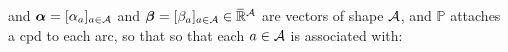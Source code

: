 \documentclass{article}
\newcommand\vjoe[1]{{\color{joecolor}\textbf{$\boldsymbol\{$Joe: }#1 \textbf{$\boldsymbol\}$}}}
\begin{document}
\begin{defn}
    and
     $\boldsymbol\alpha = [\alpha_a]_{a \in \mathcal A}$ and $\boldsymbol\beta = [\beta_a]_{a \in \mathcal A} \in \mskip1mu\overline{\mskip-1mu\mathbb R\!}\,^\mathcal A$
    are vectors of shape $\mathcal A$,
    and $\mathbb P$
    attaches a cpd to each arc, so that
    so that each 
    $a \in \mathcal A$ is associated with:
    

\end{defn}
\end{document}
